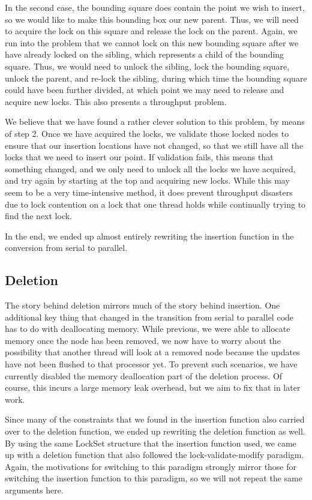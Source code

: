 \documentclass[10pt]{article}
\begin{document}
In the second case, the bounding square does contain the point we wish to insert, so we would like to make this bounding box our new parent. Thus, we will need to acquire the lock on this square and release the lock on the parent. Again, we run into the problem that we cannot lock on this new bounding square after we have already locked on the sibling, which represents a child of the bounding square. Thus, we would need to unlock the sibling, lock the bounding square, unlock the parent, and re-lock the sibling, during which time the bounding square could have been further divided, at which point we may need to release and acquire new locks. This also presents a throughput problem.

We believe that we have found a rather clever solution to this problem, by means of step 2. Once we have acquired the locks, we validate those locked nodes to ensure that our insertion locations have not changed, so that we still have all the locks that we need to insert our point. If validation fails, this means that something changed, and we only need to unlock all the locks we have acquired, and try again by starting at the top and acquiring new locks. While this may seem to be a very time-intensive method, it does prevent throughput disasters due to lock contention on a lock that one thread holds while continually trying to find the next lock.

In the end, we ended up almost entirely rewriting the insertion function in the conversion from serial to parallel.

\subsection{Deletion}
The story behind deletion mirrors much of the story behind insertion. One additional key thing that changed in the transition from serial to parallel code has to do with deallocating memory. While previous, we were able to allocate memory once the node has been removed, we now have to worry about the possibility that another thread will look at a removed node because the updates have not been flushed to that processor yet. To prevent such scenarios, we have currently disabled the memory deallocation part of the deletion process. Of course, this incurs a large memory leak overhead, but we aim to fix that in later work.

Since many of the constraints that we found in the insertion function also carried over to the deletion function, we ended up rewriting the deletion function as well. By using the same LockSet structure that the insertion function used, we came up with a deletion function that also followed the lock-validate-modify paradigm. Again, the motivations for switching to this paradigm strongly mirror those for switching the insertion function to this paradigm, so we will not repeat the same arguments here.
\end{document}
